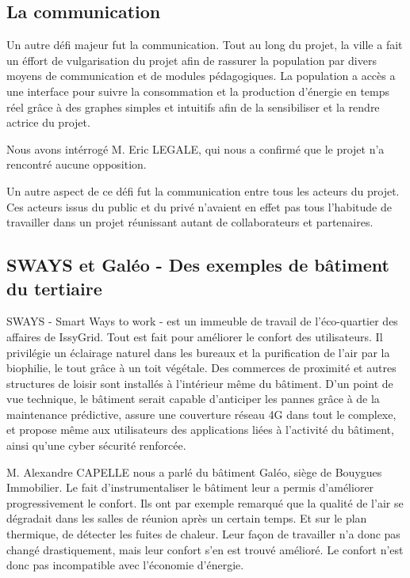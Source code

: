 \subsection{La communication}
Un autre défi majeur fut la communication.
Tout au long du projet, la ville a fait un éffort de vulgarisation du projet afin de rassurer
la population par divers moyens de communication et de modules pédagogiques. La population a accès
a une interface pour suivre la consommation et la production d'énergie en temps réel grâce à des
graphes simples et intuitifs afin de la sensibiliser et la rendre actrice du projet.

Nous avons intérrogé M. Eric LEGALE, qui nous a confirmé que le projet n'a rencontré aucune opposition.

Un autre aspect de ce défi fut la communication entre tous les acteurs du projet.
Ces acteurs issus du public et du privé n'avaient en effet pas tous l'habitude de travailler
dans un projet réunissant autant de collaborateurs et partenaires.


\subsection{SWAYS et Galéo - Des exemples de bâtiment du tertiaire}
SWAYS - Smart Ways to work - est un immeuble de travail de l'éco-quartier des affaires de IssyGrid.
Tout est fait pour améliorer le confort des utilisateurs.
Il privilégie un éclairage naturel dans les bureaux et la purification de l'air par la biophilie,
le tout grâce à un toit végétale. Des commerces de proximité et autres structures de loisir
sont installés à l'intérieur même du bâtiment. D'un point de vue technique, le bâtiment serait
capable d'anticiper les pannes grâce à de la maintenance prédictive, assure une couverture réseau
4G dans tout le complexe, et propose même aux utilisateurs des applications liées à l'activité du
bâtiment, ainsi qu'une cyber sécurité renforcée.

M. Alexandre CAPELLE nous a parlé du bâtiment Galéo, siège de Bouygues Immobilier.
Le fait d'instrumentaliser le bâtiment leur a permis d'améliorer progressivement le confort.
Ils ont par exemple remarqué que la qualité de l'air se dégradait dans les salles de réunion après un certain temps.
Et sur le plan thermique, de détecter les fuites de chaleur.
Leur façon de travailler n'a donc pas changé drastiquement, mais leur confort s'en est trouvé amélioré.
Le confort n'est donc pas incompatible avec l'économie d'énergie.

